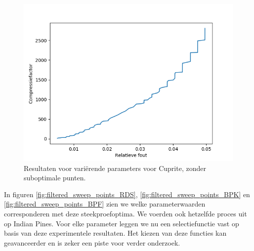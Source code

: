 \begin{figure}[H]
  \centering
  \includegraphics[scale=0.7]{images/filtered_sweep_points_cuprite.png}
  \caption{Resultaten voor vari\"erende parameters voor Cuprite, zonder suboptimale punten.}
  \label{fig:filtered_sweep_points_cuprite}
\end{figure}

In figuren \ref{fig:filtered_sweep_points_RDS}, \ref{fig:filtered_sweep_points_BPK} en \ref{fig:filtered_sweep_points_BPF} zien we welke parameterwaarden corresponderen met deze steekproefoptima. We voerden ook hetzelfde proces uit op Indian Pines. Voor elke parameter leggen we nu een selectiefunctie vast op basis van deze experimentele resultaten. Het kiezen van deze functies kan geavanceerder en is zeker een piste voor verder onderzoek.

